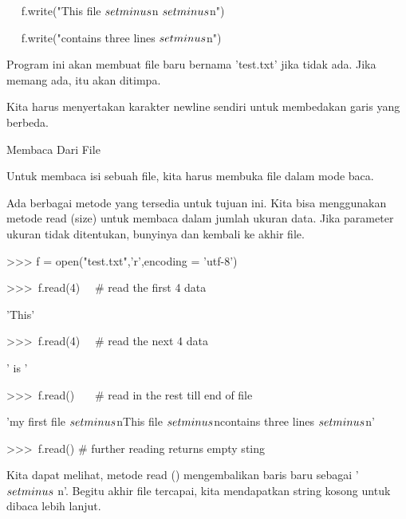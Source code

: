 ~~ f.write("This file $  \\setminus  $n $  \\setminus  $n") \par
~~ f.write("contains three lines $  \\setminus  $n") \par
\vspace{12pt}
Program ini akan membuat file baru bernama 'test.txt' jika tidak ada. Jika memang ada, itu akan ditimpa. \par
\vspace{12pt}
Kita harus menyertakan karakter newline sendiri untuk membedakan garis yang berbeda. \par
Membaca Dari File \par
\vspace{12pt}
Untuk membaca isi sebuah file, kita harus membuka file dalam mode baca. \par
\vspace{12pt}
Ada berbagai metode yang tersedia untuk tujuan ini. Kita bisa menggunakan metode read (size) untuk membaca dalam jumlah ukuran data. Jika parameter ukuran tidak ditentukan, bunyinya dan kembali ke akhir file. \par
\vspace{12pt}
\vspace{12pt}
>>> f = open("test.txt",'r',encoding = 'utf-8') \par
>>>~f.read(4)~~   $  \#  $ read the first 4 data \par
'This' \par
\vspace{12pt}
>>>~f.read(4)~~   $  \#  $ read the next 4 data \par
' is ' \par
\vspace{12pt}
>>>~f.read()~~~   $  \#  $ read in the rest till end of file \par
'my first file $  \\setminus  $nThis file $  \\setminus  $ncontains three lines $  \\setminus  $n' \par
\vspace{12pt}
>>>~f.read()   $  \#  $ further reading returns empty sting \par
\vspace{12pt}
\vspace{12pt}
Kita dapat melihat, metode read () mengembalikan baris baru sebagai ' $  \\setminus  $ n'. Begitu akhir file tercapai, kita mendapatkan string kosong untuk dibaca lebih lanjut. \par
